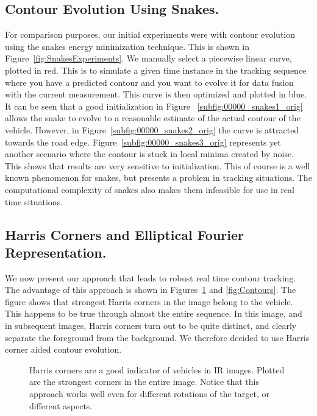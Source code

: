 \documentclass{article}
\begin{document}
\subsection{Contour Evolution Using Snakes.}
For comparison purposes, our initial experiments were with contour evolution using the snakes energy minimization technique.  This is shown in Figure~\ref{fig:SnakesExperiments}.  We manually select a piecewise linear curve, plotted in red.  This is to simulate a given time instance in the tracking sequence where you have a predicted contour and you want to evolve it for data fusion with the current measurement.  This curve is then optimized and plotted in blue.  It can be seen that a good initialization in Figure ~\ref{subfig:00000_snakes1_orig} allows the snake to evolve to a reasonable estimate of the actual contour of the vehicle.  However, in Figure~\ref{subfig:00000_snakes2_orig} the curve is attracted towards the road edge.  Figure~\ref{subfig:00000_snakes3_orig} represents yet another scenario where the contour is stuck in local minima created by noise.  This shows that results are very sensitive to initialization.  This of course is a well known phenomenon for snakes, but presents a problem in tracking situations.  The computational complexity of snakes also makes them infeasible for use in real time situations.


\subsection{Harris Corners and Elliptical Fourier Representation.}
We now present our approach that leads to robust real time contour tracking. The advantage of this approach is shown in Figures~\ref{fig:Corners} and \ref{fig:Contours}.  The figure shows that strongest Harris corners in the image belong to the vehicle.  This happens to be true through almost the entire sequence.  In this image, and in subsequent images, Harris corners turn out to be quite distinct, and clearly separate the foreground from the background.  We therefore decided to use Harris corner aided contour evolution. 

\begin{figure}[t]
			\centering
			\caption{Harris corners are a good indicator of vehicles in IR images. Plotted are the strongest corners in the entire image.  Notice that this approach works well even for different rotations of the target, or different aspects.} 	
			\label{fig:Corners}	
\end{figure}
\end{document}
